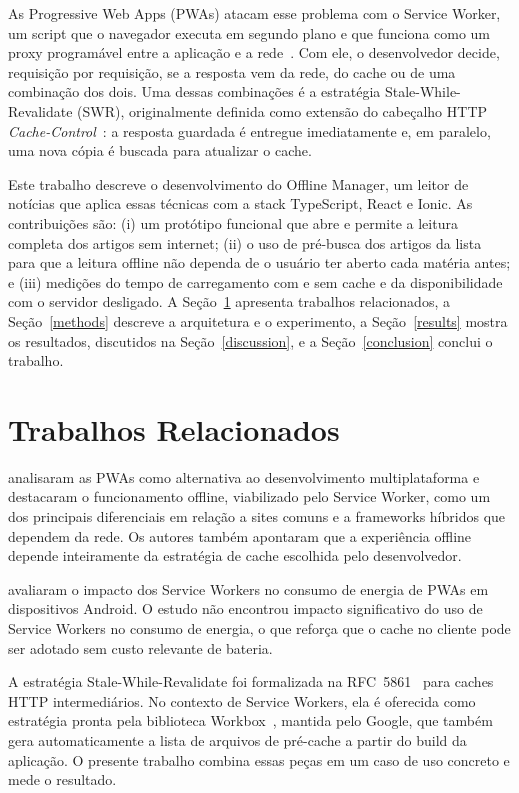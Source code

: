 \documentclass[preprint,10pt,5p]{elsarticle}
\begin{document}
As Progressive Web Apps (PWAs) atacam esse problema com o Service Worker, um script que o navegador executa em segundo plano e que funciona como um proxy programável entre a aplicação e a rede~\citep{w3c2022sw}. Com ele, o desenvolvedor decide, requisição por requisição, se a resposta vem da rede, do cache ou de uma combinação dos dois. Uma dessas combinações é a estratégia Stale-While-Revalidate (SWR), originalmente definida como extensão do cabeçalho HTTP \textit{Cache-Control}~\citep{nottingham2010rfc5861}: a resposta guardada é entregue imediatamente e, em paralelo, uma nova cópia é buscada para atualizar o cache.

Este trabalho descreve o desenvolvimento do Offline Manager, um leitor de notícias que aplica essas técnicas com a stack TypeScript, React e Ionic. As contribuições são: (i) um protótipo funcional que abre e permite a leitura completa dos artigos sem internet; (ii) o uso de pré-busca dos artigos da lista para que a leitura offline não dependa de o usuário ter aberto cada matéria antes; e (iii) medições do tempo de carregamento com e sem cache e da disponibilidade com o servidor desligado. A Seção~\ref{works} apresenta trabalhos relacionados, a Seção~\ref{methods} descreve a arquitetura e o experimento, a Seção~\ref{results} mostra os resultados, discutidos na Seção~\ref{discussion}, e a Seção~\ref{conclusion} conclui o trabalho.


\section{Trabalhos Relacionados}
\label{works}

\citet{biornhansen2017pwa} analisaram as PWAs como alternativa ao desenvolvimento multiplataforma e destacaram o funcionamento offline, viabilizado pelo Service Worker, como um dos principais diferenciais em relação a sites comuns e a frameworks híbridos que dependem da rede. Os autores também apontaram que a experiência offline depende inteiramente da estratégia de cache escolhida pelo desenvolvedor.

\citet{malavolta2017energy} avaliaram o impacto dos Service Workers no consumo de energia de PWAs em dispositivos Android. O estudo não encontrou impacto significativo do uso de Service Workers no consumo de energia, o que reforça que o cache no cliente pode ser adotado sem custo relevante de bateria.

A estratégia Stale-While-Revalidate foi formalizada na RFC~5861~\citep{nottingham2010rfc5861} para caches HTTP intermediários. No contexto de Service Workers, ela é oferecida como estratégia pronta pela biblioteca Workbox~\citep{workbox2024}, mantida pelo Google, que também gera automaticamente a lista de arquivos de pré-cache a partir do build da aplicação. O presente trabalho combina essas peças em um caso de uso concreto e mede o resultado.
\end{document}
